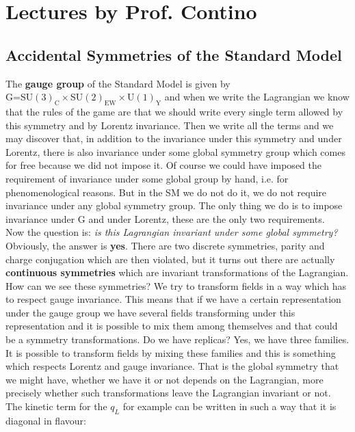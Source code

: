 \documentclass[../main.tex]{subfiles}
\begin{document}
\setchapterpreamble[u]{\margintoc}
\chapter[Lectures by Prof. Contino]{Lectures by Prof. Contino\footnotemark[0]}
\section{Accidental Symmetries of the Standard Model}
The \textbf{gauge group} of the Standard Model is given by\\ G=SU$(3)_{\text{C}}\times$SU$(2)_{\text{EW}}\times$U$(1)_{\text{Y}}$ and when we write the Lagrangian we know that the rules of the game are that we should write every single term allowed by this symmetry and by Lorentz invariance. Then we write all the terms and we may discover that, in addition to the invariance under this symmetry and under Lorentz, there is also invariance under some global symmetry group which comes for free because we did not impose it. Of course we could have imposed the requirement of invariance under some global group by hand, i.e. for phenomenological reasons. But in the SM we do not do it, we do not require invariance under any global symmetry group. The only thing we do is to impose invariance under G and under Lorentz, these are the only two requirements.\\
Now the question is: \textit{is this Lagrangian invariant under some global symmetry?} Obviously, the answer is \textbf{yes}. There are two discrete symmetries, parity and charge conjugation which are then violated, but it turns out there are actually \textbf{continuous symmetries} which are invariant transformations of the Lagrangian. How can we see these symmetries? We try to transform fields in a way which has to respect gauge invariance. This means that if we have a certain representation under the gauge group we have several fields transforming under this representation and it is possible to mix them among themselves and that could be a symmetry transformations. Do we have replicas? Yes, we have three families. It is possible to transform fields by mixing these families and this is something which respects Lorentz and gauge invariance. That is the global symmetry that we might have, whether we have it or not depends on the Lagrangian, more precisely whether such transformations leave the Lagrangian invariant or not.\\ 
The kinetic term for the $q_L$ for example can be written in such a way that it is diagonal in flavour:
\end{document}
